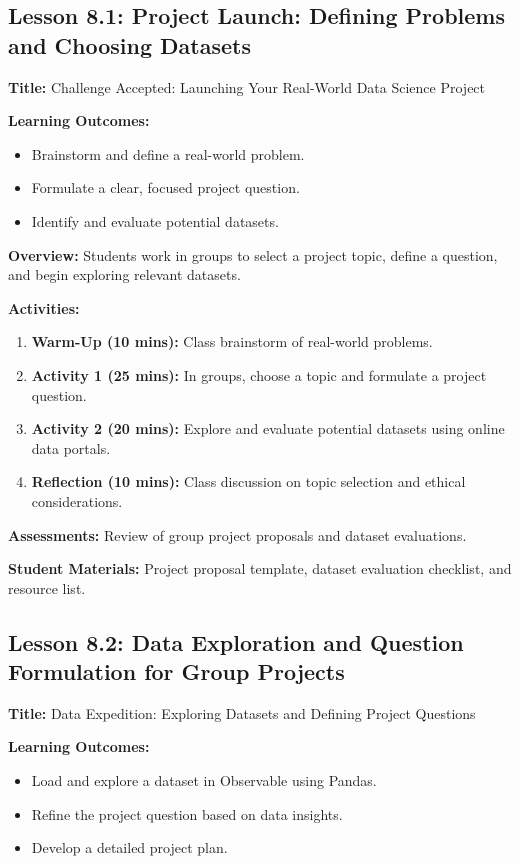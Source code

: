 \documentclass{tufte-book}
\begin{document}
\subsection{Lesson 8.1: Project Launch: Defining Problems and Choosing Datasets}
\textbf{Title:} Challenge Accepted: Launching Your Real-World Data Science Project

\medskip
\textbf{Learning Outcomes:}
\begin{itemize}[leftmargin=*, label={\textbullet}]
    \item Brainstorm and define a real-world problem.
    \item Formulate a clear, focused project question.
    \item Identify and evaluate potential datasets.
\end{itemize}

\medskip
\textbf{Overview:}  
Students work in groups to select a project topic, define a question, and begin exploring relevant datasets.

\medskip
\textbf{Activities:}
\begin{enumerate}[label=\arabic*.]
    \item \textbf{Warm-Up (10 mins):} Class brainstorm of real-world problems.
    \item \textbf{Activity 1 (25 mins):} In groups, choose a topic and formulate a project question.
    \item \textbf{Activity 2 (20 mins):} Explore and evaluate potential datasets using online data portals.
    \item \textbf{Reflection (10 mins):} Class discussion on topic selection and ethical considerations.
\end{enumerate}

\medskip
\textbf{Assessments:}  
Review of group project proposals and dataset evaluations.

\medskip
\textbf{Student Materials:}  
Project proposal template, dataset evaluation checklist, and resource list.

\subsection{Lesson 8.2: Data Exploration and Question Formulation for Group Projects}
\textbf{Title:} Data Expedition: Exploring Datasets and Defining Project Questions

\medskip
\textbf{Learning Outcomes:}
\begin{itemize}[leftmargin=*, label={\textbullet}]
    \item Load and explore a dataset in Observable using Pandas.
    \item Refine the project question based on data insights.
    \item Develop a detailed project plan.
\end{itemize}
\end{document}
